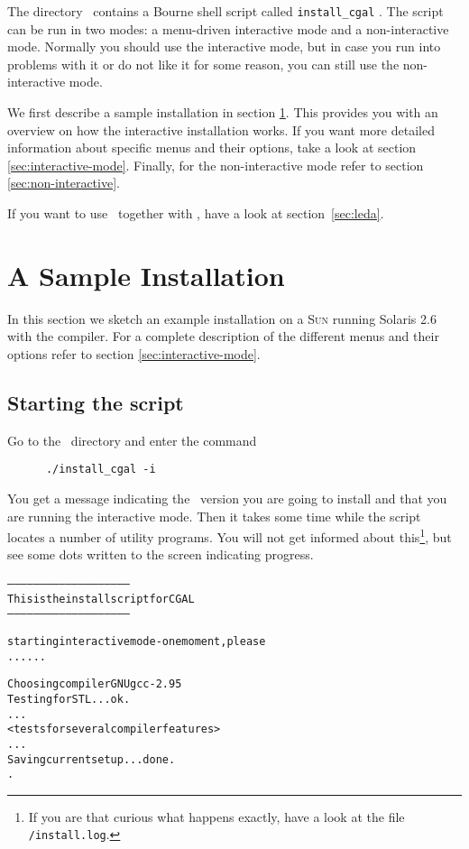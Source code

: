 The directory \cgaldir\ contains a Bourne shell script called
\texttt{install\_cgal}
. The script can be run in two
modes: a menu-driven interactive mode and a non-interactive mode.
Normally you should use the interactive mode, but in case you run into
problems with it or do not like it for some reason, you can still use
the non-interactive mode.

We first describe a sample installation in section
\ref{sec:sample-inst}. This provides you with an overview on how the
interactive installation works. If you want more detailed information
about specific menus and their options, take a look at section
\ref{sec:interactive-mode}. Finally, for the non-interactive mode
refer to section \ref{sec:non-interactive}.

If you want to use \leda\ together with \cgal, have a look at
section~\ref{sec:leda}.

\section{A Sample Installation}\label{sec:sample-inst}

In this section we sketch an example installation on a \textsc{Sun}
running Solaris 2.6 with the  compiler. For a complete
description of the different menus and their options refer to section
\ref{sec:interactive-mode}.

\subsection{Starting the script}

Go to the \cgaldir\ directory and enter the command
\begin{verbatim}
      ./install_cgal -i
\end{verbatim}

You get a message indicating the \cgal\ version you are going to
install and that you are running the interactive mode. Then it takes
some time while the script locates a number of utility programs. You
will not get informed about this\footnote{If you are that curious what
  happens exactly, have a look at the file
  \texttt{\cgaldir/install.log}.}, but see some
dots written to the screen indicating progress.

{\ccTexHtml{\scriptsize}{}
\begin{alltt}
--------------------------------------------------------
  This is the install script for CGAL \cgalrelease
--------------------------------------------------------

starting interactive mode - one moment, please
......

  Choosing compiler GNU gcc-2.95
  Testing for STL ... ok.
  ...
  <tests for several compiler features>
  ...
  Saving current setup ... done.
.
\end{alltt}}
  
